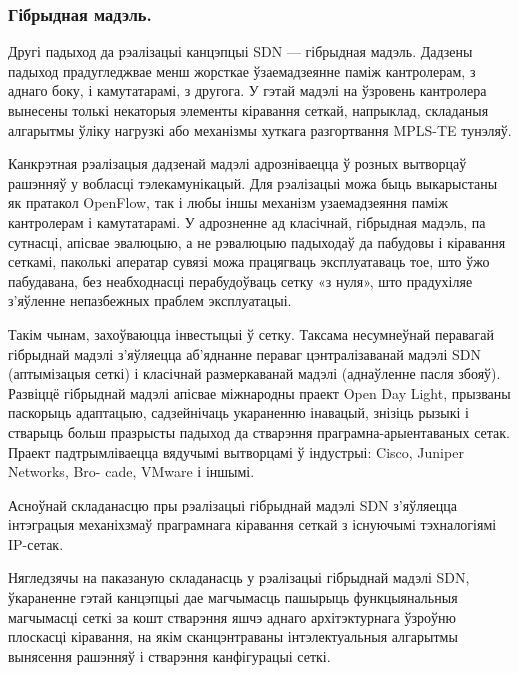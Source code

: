 \subsubsection{Гібрыдная мадэль.}
Другі падыход да рэалізацыі канцэпцыі SDN ---
гібрыдная мадэль.
Дадзены падыход прадугледжвае менш жорсткае ўзаемадзеянне паміж
кантролерам, з аднаго боку, і камутатарамі, з другога.
У гэтай мадэлі на ўзровень кантролера вынесены толькі некаторыя элементы кіравання сеткай, напрыклад, складаныя
алгарытмы ўліку нагрузкі або механізмы хуткага разгортвання MPLS-TE тунэляў.

Канкрэтная рэалізацыя дадзенай мадэлі адрозніваецца ў розных вытворцаў рашэнняў у вобласці тэлекамунікацый. Для рэалізацыі можа быць выкарыстаны як пратакол OpenFlow,
так і любы іншы механізм узаемадзеяння паміж кантролерам і камутатарамі.
У адрозненне ад класічнай, гібрыдная мадэль, па сутнасці, апісвае эвалюцыю, а не рэвалюцыю падыходаў да пабудовы і кіравання сеткамі, паколькі аператар сувязі можа
працягваць эксплуатаваць тое, што ўжо пабудавана, без неабходнасці перабудоўваць
сетку «з нуля», што прадухіляе з'яўленне непазбежных праблем эксплуатацыі.

Такім чынам, захоўваюцца інвестыцыі ў сетку. Таксама несумнеўнай перавагай гібрыднай
мадэлі з'яўляецца аб'яднанне пераваг цэнтралізаванай мадэлі SDN (аптымізацыя
сеткі) і класічнай размеркаванай мадэлі (аднаўленне пасля збояў).
Развіццё гібрыднай мадэлі апісвае міжнародны праект Open Day Light, прызваны паскорыць адаптацыю, садзейнічаць укараненню інавацый, знізіць рызыкі і стварыць больш празрысты падыход да стварэння праграмна-арыентаваных сетак.
Праект падтрымліваецца вядучымі вытворцамі ў індустрыі: Cisco, Juniper Networks, Bro-
cade, VMware і іншымі.

Асноўнай складанасцю пры рэалізацыі гібрыднай мадэлі SDN з'яўляецца інтэграцыя механіхзмаў праграмнага кіравання сеткай з існуючымі тэхналогіямі IP-сетак.

Нягледзячы на паказаную складанасць у рэалізацыі гібрыднай мадэлі SDN, ўкараненне
гэтай канцэпцыі дае магчымасць пашырыць функцыянальныя магчымасці сеткі за кошт
стварэння яшчэ аднаго архітэктурнага ўзроўню плоскасці кіравання, на якім
сканцэнтраваны інтэлектуальныя алгарытмы вынясення рашэнняў і стварэння канфігурацыі сеткі.
